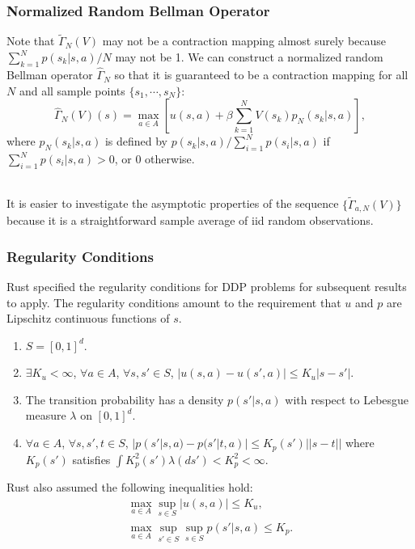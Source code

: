 \documentclass{beamer}
\begin{document}
\begin{frame}[fragile]
\frametitle{Normalized Random Bellman Operator}

Note that $\widetilde{\Gamma}_N(V)$ may not be a contraction mapping almost surely because $\sum_{k=1}^Np(s_k|s, a)/N$ may not be 1. We can construct a normalized random Bellman operator $\widehat{\Gamma}_N$ so that it is guaranteed to be a contraction mapping for all $N$ and all sample points $\{s_1, \cdots, s_N\}$:
\[
\widehat{\Gamma}_N(V)(s)=\max_{a\in A}\left[u(s, a)+\beta\sum_{k=1}^NV(s_k)p_N(s_k|s, a)\right],
\]
where $p_N(s_k|s, a)$ is defined by $p(s_k|s, a)/\sum_{i=1}^Np(s_i|s, a)$ if $\sum_{i=1}^Np(s_i|s, a)>0$, or 0 otherwise. \\~\

It is easier to investigate the asymptotic properties of the sequence $\{\widetilde{\Gamma}_{a, N}(V)\}$ because it is a straightforward sample average of iid random observations.
\end{frame}

\begin{frame}[fragile]
\frametitle{Regularity Conditions}

Rust specified the regularity conditions for DDP problems for subsequent results to apply. The regularity conditions amount to the requirement that $u$ and $p$ are Lipschitz continuous functions of $s$.
\begin{enumerate}
\item $S=[0, 1]^d$.
\item $\exists K_u<\infty$, $\forall a\in A$, $\forall s, s'\in S$, $|u(s, a)-u(s', a)|\leq K_u|s-s'|$.
\item The transition probability has a density $p(s'|s, a)$ with respect to Lebesgue measure $\lambda$ on $[0, 1]^d$.
\item $\forall a\in A$, $\forall s, s', t\in S$, $|p(s'|s, a)-p(s'|t, a)|\leq K_p(s')||s-t||$ where $K_p(s')$ satisfies $\int K_p^2(s')\lambda(ds')<K_p^2<\infty$.
\end{enumerate}
Rust also assumed the following inequalities hold:
\begin{gather*}
\max_{a\in A}\sup_{s\in S}|u(s, a)|\leq K_u,\\
\max_{a\in A}\sup_{s'\in S}\sup_{s\in S}p(s'|s, a)\leq K_p.
\end{gather*}
\end{frame}
\end{document}
